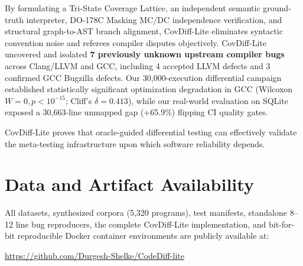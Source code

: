 \documentclass[sigconf,review,anonymous=false]{acmart}
\theoremstyle{definition}
\begin{document}
By formulating a Tri-State Coverage Lattice, an independent semantic ground-truth interpreter, DO-178C Masking MC/DC independence verification, and structural graph-to-AST branch alignment, CovDiff-Lite eliminates syntactic convention noise and referees compiler disputes objectively. CovDiff-Lite uncovered and isolated \textbf{7 previously unknown upstream compiler bugs} across Clang/LLVM and GCC, including 4 accepted LLVM defects and 3 confirmed GCC Bugzilla defects. Our 30,000-execution differential campaign established statistically significant optimization degradation in GCC (Wilcoxon $W=0, p < 10^{-15}$; Cliff's $\delta = 0.413$), while our real-world evaluation on SQLite exposed a 30,663-line unmapped gap (+65.9\%) flipping CI quality gates.

CovDiff-Lite proves that oracle-guided differential testing can effectively validate the meta-testing infrastructure upon which software reliability depends.

\section*{Data and Artifact Availability}
All datasets, synthesized corpora (5,320 programs), test manifests, standalone 8--12 line bug reproducers, the complete CovDiff-Lite implementation, and bit-for-bit reproducible Docker container environments are publicly available at:
\begin{center}
\url{https://github.com/Durgesh-Shelke/CodeDiff-lite}
\end{center}
\end{document}
